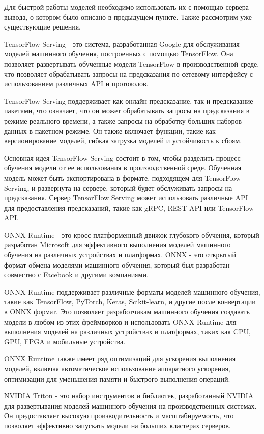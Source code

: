 Для быстрой работы моделей необходимо использовать их с помощью сервера вывода, о котором было описано в предыдущем пункте. Также рассмотрим уже существующие решения.

TensorFlow Serving - это система, разработанная Google для обслуживания моделей машинного обучения, построенных с помощью TensorFlow. Она позволяет развертывать обученные модели TensorFlow в производственной среде, что позволяет обрабатывать запросы на предсказания по сетевому интерфейсу с использованием различных API и протоколов.

TensorFlow Serving поддерживает как онлайн-предсказание, так и предсказание пакетами, что означает, что он может обрабатывать запросы на предсказания в режиме реального времени, а также запросы на обработку больших наборов данных в пакетном режиме. Он также включает функции, такие как версионирование моделей, гибкая загрузка моделей и устойчивость к сбоям.

Основная идея TensorFlow Serving состоит в том, чтобы разделить процесс обучения модели от ее использования в производственной среде. Обученная модель может быть экспортирована в формате, подходящем для TensorFlow Serving, и развернута на сервере, который будет обслуживать запросы на предсказания. Сервер TensorFlow Serving может использовать различные API для предоставления предсказаний, такие как gRPC, REST API или TensorFlow API.

ONNX Runtime - это кросс-платформенный движок глубокого обучения, который разработан Microsoft для эффективного выполнения моделей машинного обучения на различных устройствах и платформах. ONNX - это открытый формат обмена моделями машинного обучения, который был разработан совместно с Facebook и другими компаниями.

ONNX Runtime поддерживает различные форматы моделей машинного обучения, такие как TensorFlow, PyTorch, Keras, Scikit-learn, и другие после конвертации в ONNX формат. Это позволяет разработчикам машинного обучения создавать модели в любом из этих фреймворков и использовать ONNX Runtime для выполнения моделей на различных устройствах и платформах, таких как CPU, GPU, FPGA и мобильные устройства.

ONNX Runtime также имеет ряд оптимизаций для ускорения выполнения моделей, включая автоматическое использование аппаратного ускорения, оптимизации для уменьшения памяти и быстрого выполнения операций.

NVIDIA Triton - это набор инструментов и библиотек, разработанный NVIDIA для развертывания моделей машинного обучения на производственных системах. Он предоставляет высокую производительность и масштабируемость, что позволяет эффективно запускать модели на больших кластерах серверов.

